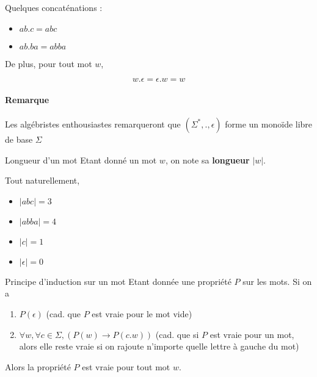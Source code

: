 \begin{example}{Quelques concaténations :}

\begin{itemize}
    \item $ab.c = abc$
    \item $ab.ba = abba$
\end{itemize}
\end{example}

 De plus, pour tout mot $w$, 

\[
    w.\epsilon = \epsilon.w = w
\]

\paragraph{Remarque} Les algébristes enthousiastes remarqueront que $(\Sigma^*,.,\epsilon)$ forme un monoïde libre de base $\Sigma$


\begin{definition}{Longueur d'un mot}{}
Etant donné un mot $w$, on note sa \textbf{longueur} $|w|$.
\end{definition}

\begin{example}
Tout naturellement,
\begin{itemize}
    \item $|abc| = 3$
    \item $|abba| = 4$
    \item $|c| = 1$
    \item $|\epsilon| = 0$
\end{itemize}
\end{example}

\begin{definition}{Principe d'induction sur un mot}{}
Etant donnée une propriété $P$ sur les mots. Si on a\\

\begin{enumerate}
\item $P(\epsilon)$ (cad. que $P$ est vraie pour le mot vide)
\item $\forall w, \forall c \in \Sigma, (P(w) \rightarrow P(c.w))$ (cad. que si $P$ est vraie pour un mot, alors elle reste vraie si on rajoute n'importe quelle lettre à gauche du mot)\\
\end{enumerate}

Alors la propriété $P$ est vraie pour tout mot $w$.
\end{definition}

